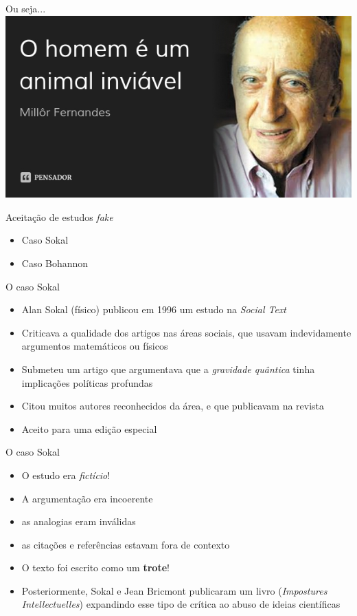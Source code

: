 \documentclass{beamer}
\begin{document}
\begin{frame}{Ou seja...}
  \includegraphics[width=\textwidth]{Planejamento/millor}
\end{frame}

\begin{frame}{Aceitação de estudos {\em fake}}
  \begin{itemize}
  \item Caso Sokal
    \bigskip
  \item Caso Bohannon
  \end{itemize}
\end{frame}

\begin{frame}{O caso Sokal}
  \begin{itemize}
    \footnotesize
  \item Alan Sokal (físico) publicou em 1996 um estudo na {\em Social
      Text}
    \medskip
  \item Criticava a qualidade dos artigos nas áreas sociais, que
    usavam indevidamente argumentos matemáticos ou físicos
    \medskip
  \item Submeteu um artigo que argumentava que a {\em gravidade
      quântica} tinha implicações políticas profundas
    \medskip
  \item Citou muitos autores reconhecidos da área, e que publicavam na
    revista
    \medskip
  \item Aceito para uma edição especial
  \end{itemize}
\end{frame}

\begin{frame}{O caso Sokal}
  \begin{itemize}
    \footnotesize
  \item O estudo era {\em fictício}!
    \medskip
  \item A argumentação era incoerente
    \medskip
  \item as analogias eram inválidas
    \medskip
  \item as citações e referências estavam fora de contexto
    \medskip
  \item O texto foi escrito como um {\bf trote}!
    \medskip
  \item Posteriormente, Sokal e Jean Bricmont publicaram um livro
    ({\em Impostures Intellectuelles}) expandindo esse tipo de crítica
    ao abuso de ideias científicas
  \end{itemize}
\end{frame}
\end{document}
